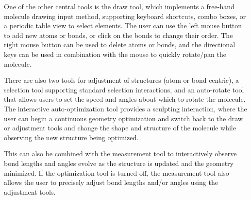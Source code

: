 \documentclass[10pt]{bmc_article}
\newenvironment{bmcformat}{\begin{raggedright}
\baselineskip20pt\sloppy\setboolean{publ}{false}}{\end{raggedright}
\baselineskip20pt\sloppy}
\begin{document}
\begin{bmcformat}
One of the other central tools is the draw tool, which implements a free-hand
molecule drawing input method, supporting keyboard shortcuts, combo boxes, or a
periodic table view to select elements. The user can use the left mouse button
to add new atoms or bonds, or click on the bonds to change their order. The
right mouse button can be used to delete atoms or bonds, and the directional keys
can be used in combination with the mouse to quickly rotate/pan the molecule.

There are also two tools for adjustment of structures (atom or bond centric), a
selection tool supporting standard selection interactions, and an auto-rotate
tool that allows users to set the speed and angles about which to rotate the
molecule. The interactive auto-optimization tool provides a sculpting
interaction, where the user can begin a continuous geometry optimization and
switch back to the draw or adjustment tools and change the shape and structure
of the molecule while observing the new structure being optimized.

This can also be combined with the measurement tool to interactively observe
bond lengths and angles evolve as the structure is updated and the geometry
minimized. If the optimization tool is turned off, the measurement tool also
allows the user to precisely adjust bond lengths and/or angles using the
adjustment tools.


\end{bmcformat}
\end{document}
